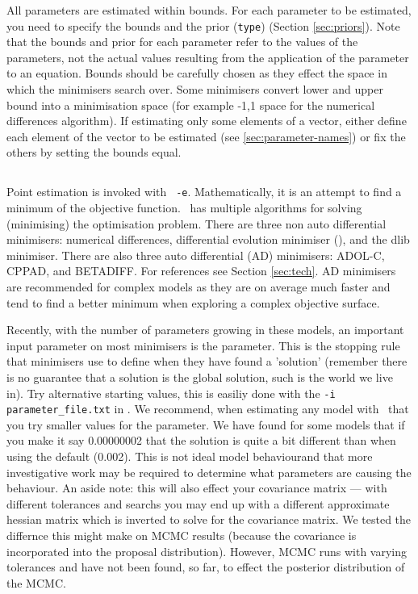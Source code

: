 All parameters are estimated within bounds. For each parameter to be estimated, you need to specify the bounds and the prior (\texttt{type}) (Section \ref{sec:priors}). Note that the bounds and prior for each parameter refer to the values of the parameters, not the actual values resulting from the application of the parameter to an equation. Bounds should be carefully chosen as they effect the space in which the minimisers search over. Some minimisers convert lower and upper bound into a minimisation space (for example -1,1 space for the numerical differences algorithm). If estimating only some elements of a vector, either define each element of the vector to be estimated (see \ref{sec:parameter-names}) or fix the others by setting the bounds equal.

\subsection{\label{sec:estimate-MPD}}
Point estimation is invoked with \texttt{\cname\ -e}. Mathematically, it is an attempt to find a minimum of the objective function. \CNAME\ has multiple algorithms for solving (minimising) the optimisation problem. There are three non auto differential minimisers: numerical differences, differential evolution minimiser (), and the dlib minimiser. There are also three auto differential (AD) minimisers: ADOL-C, CPPAD, and BETADIFF. For references see Section \ref{sec:tech}. AD minimisers are recommended for complex models as they are on average much faster and tend to find a better minimum when exploring a complex objective surface. 

Recently, with the number of parameters growing in these models, an important input parameter on most minimisers is the  parameter. This is the stopping rule that minimisers use to define when they have found a 'solution' (remember there is no guarantee that a solution is the global solution, such is the world we live in). Try  alternative starting values, this is easiliy done with the \texttt{-i parameter\_file.txt} in \CNAME. We recommend, when estimating any model with \CNAME\, that you try smaller values for the  parameter. We have found for some models that if you make it say 0.00000002 that the solution is quite a bit different than when using the default (0.002). This is not ideal model behaviourand that more investigative work may be required to determine what parameters are causing the behaviour. An aside note: this will also effect your covariance matrix --- with different tolerances and searchs you may end up with a different approximate hessian matrix which is inverted to solve for the covariance matrix. We tested the differnce this might make on MCMC results (because the covariance is incorporated into the proposal distribution). However,  MCMC runs with varying tolerances and have not been found, so far, to effect the posterior distribution of the MCMC.
